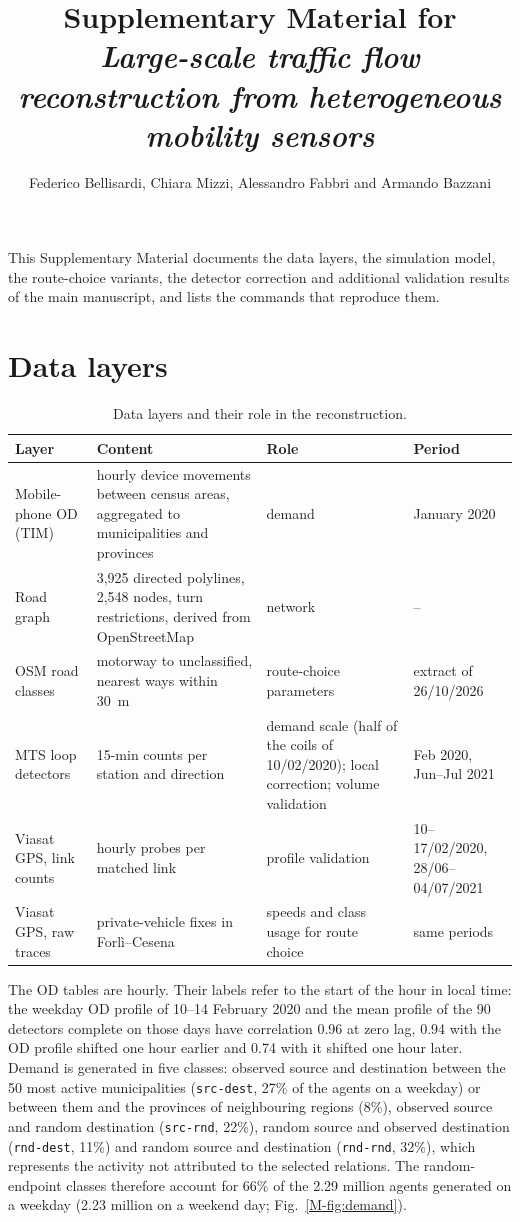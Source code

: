 \documentclass[11pt,a4paper]{article}
\title{Supplementary Material for\\
\emph{Large-scale traffic flow reconstruction from heterogeneous mobility sensors}}
\author{Federico Bellisardi, Chiara Mizzi, Alessandro Fabbri and Armando Bazzani}
\date{}
\newcommand{\code}[1]{\texttt{#1}}
\begin{document}
\maketitle


\noindent This Supplementary Material documents the data layers, the simulation model, the route-choice variants, the detector correction and additional validation results of the main manuscript, and lists the commands that reproduce them.

\section{Data layers}
\label{sec:data-layers}

\begin{table}[htbp]\centering
\caption{Data layers and their role in the reconstruction.}
\label{tab:layers}
\begin{tabularx}{\textwidth}{@{}lXXl@{}}\toprule
Layer & Content & Role & Period \\\midrule
Mobile-phone OD (TIM) & hourly device movements between census areas, aggregated to municipalities and provinces & demand & January 2020 \\
Road graph & 3,925 directed polylines, 2,548 nodes, turn restrictions, derived from OpenStreetMap & network & -- \\
OSM road classes & motorway to unclassified, nearest ways within 30~m & route-choice parameters & extract of 26/10/2026 \\
MTS loop detectors & 15-min counts per station and direction & demand scale (half of the coils of 10/02/2020); local correction; volume validation & Feb 2020, Jun--Jul 2021 \\
Viasat GPS, link counts & hourly probes per matched link & profile validation & 10--17/02/2020, 28/06--04/07/2021 \\
Viasat GPS, raw traces & private-vehicle fixes in Forl\`i--Cesena & speeds and class usage for route choice & same periods \\
\bottomrule\end{tabularx}
\end{table}

The OD tables are hourly. Their labels refer to the start of the hour in local time: the weekday OD profile of 10--14 February 2020 and the mean profile of the 90 detectors complete on those days have correlation 0.96 at zero lag, 0.94 with the OD profile shifted one hour earlier and 0.74 with it shifted one hour later. Demand is generated in five classes: observed source and destination between the 50 most active municipalities (\code{src-dest}, 27\% of the agents on a weekday) or between them and the provinces of neighbouring regions (8\%), observed source and random destination (\code{src-rnd}, 22\%), random source and observed destination (\code{rnd-dest}, 11\%) and random source and destination (\code{rnd-rnd}, 32\%), which represents the activity not attributed to the selected relations. The random-endpoint classes therefore account for 66\% of the 2.29 million agents generated on a weekday (2.23 million on a weekend day; Fig.~\ref{M-fig:demand}).
\end{document}
